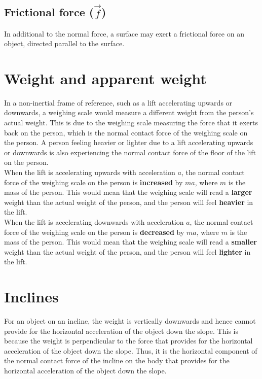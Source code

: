 \documentclass[11pt]{article}
\begin{document}
\subsection{Frictional force (\(\vec{f}\))}
\label{sec:org9f2a958}
In additional to the normal force, a surface may exert a frictional force on an object, directed parallel to the surface.

\section{Weight and apparent weight}
\label{sec:orged58ebf}
In a non-inertial frame of reference, such as a lift accelerating upwards or downwards, a weighing scale would measure a different weight from the person's actual weight. This is due to the weighing scale measuring the force that it exerts back on the person, which is the normal contact force of the weighing scale on the person. A person feeling heavier or lighter due to a lift accelerating upwards or downwards is also experiencing the normal contact force of the floor of the lift on the person.
\\[0pt]

When the lift is accelerating upwards with acceleration \(a\), the normal contact force of the weighing scale on the person is \textbf{increased} by \(ma\), where \(m\) is the mass of the person. This would mean that the weighing scale will read a \textbf{larger} weight than the actual weight of the person, and the person will feel \textbf{heavier} in the lift.
\\[0pt]

When the lift is accelerating downwards with acceleration \(a\), the normal contact force of the weighing scale on the person is \textbf{decreased} by \(ma\), where \(m\) is the mass of the person. This would mean that the weighing scale will read a \textbf{smaller} weight than the actual weight of the person, and the person will feel \textbf{lighter} in the lift.

\section{Inclines}
\label{sec:org1520683}
For an object on an incline, the weight is vertically downwards and hence cannot provide for the horizontal acceleration of the object down the slope. This is because the weight is perpendicular to the force that provides for the horizontal acceleration of the object down the slope. Thus, it is the horizontal component of the normal contact force of the incline on the body that provides for the horizontal acceleration of the object down the slope.
\end{document}
